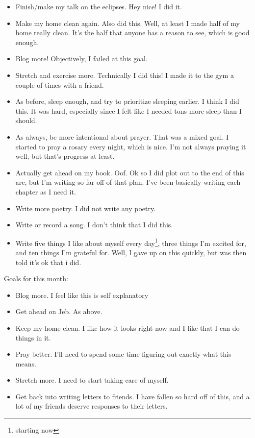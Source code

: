\documentclass[12pt]{article}[titlepage]
\renewcommand{\,}{\textsuperscript{,}}
\begin{document}
\begin{itemize}
\item Finish/make my talk on the eclipses. Hey nice! I did it.
\item Make my home clean again. Also did this.
Well, at least I made half of my home really clean.
It's the half that anyone has a reason to see, which is good enough.
\item Blog more!
Objectively, I failed at this goal.
\item Stretch and exercise more.
Technically I did this! I made it to the gym a couple of times with a friend.
\item As before, sleep enough, and try to prioritize sleeping earlier.
I think I did this.
It was hard, especially since I felt like I needed tons more sleep than I should.
\item As always, be more intentional about prayer.
That was a mixed goal.
I started to pray a rosary every night, which is nice.
I'm not always praying it well, but that's progress at least.
\item Actually get ahead on my book.
Oof.
Ok so I did plot out to the end of this arc, but I'm writing so far off of that plan.
I've been basically writing each chapter as I need it.
\item Write more poetry.
I did not write any poetry.
\item Write or record a song.
I don't think that I did this.
\item Write five things I like about myself every day\footnote{starting now}, three things I'm excited for, and ten things I'm grateful for.
Well, I gave up on this quickly, but was then told it's ok that i did.
\end{itemize}

Goals for this month:
\begin{itemize}
\item Blog more.
I feel like this is self explanatory
\item Get ahead on Jeb.
As above.
\item Keep my home clean.
I like how it looks right now and I like that I can do things in it.
\item Pray better.
I'll need to spend some time figuring out exactly what this means.
\item Stretch more.
I need to start taking care of myself.
\item Get back into writing letters to friends.
I have fallen so hard off of this, and a lot of my friends deserve responses to their letters.
\end{itemize}
\end{document}
